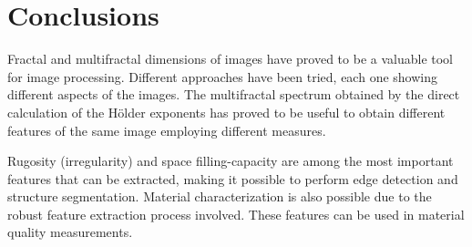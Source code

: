 \documentclass[oneside,a4paper,english,links,12pt]{article}
\begin{document}
\section{Conclusions}
Fractal and multifractal dimensions of images have proved to be a valuable tool for image processing. Different approaches have been tried, each one showing different aspects of the images. The multifractal spectrum obtained by the direct calculation of the H\"older exponents has proved to be useful to obtain different features of the same image employing different measures.

Rugosity (irregularity) and space filling-capacity are among the most important features that can be extracted, making it possible to perform edge detection and structure segmentation. Material characterization is also possible due to the robust feature extraction process involved. These features can be used in material quality measurements.



\end{document}
